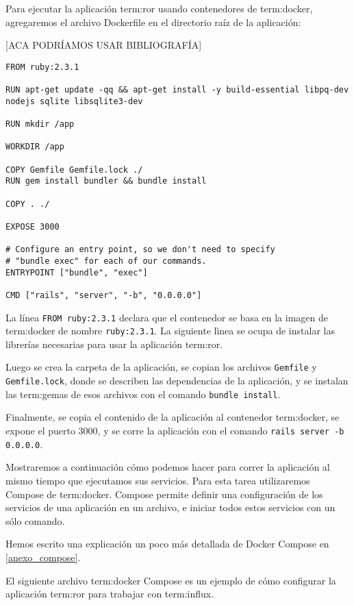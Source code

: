 Para ejecutar la aplicación \gls{term:ror} usando contenedores de
\gls{term:docker}, agregaremos el archivo Dockerfile en el directorio raíz de
la aplicación:

[ACA PODRÍAMOS USAR BIBLIOGRAFÍA]

\begin{lstlisting}
FROM ruby:2.3.1

RUN apt-get update -qq && apt-get install -y build-essential libpq-dev nodejs sqlite libsqlite3-dev

RUN mkdir /app

WORKDIR /app

COPY Gemfile Gemfile.lock ./
RUN gem install bundler && bundle install

COPY . ./

EXPOSE 3000

# Configure an entry point, so we don't need to specify 
# "bundle exec" for each of our commands.
ENTRYPOINT ["bundle", "exec"]

CMD ["rails", "server", "-b", "0.0.0.0"]
\end{lstlisting}

La línea \lstinline{FROM ruby:2.3.1} declara que el contenedor se basa en la
imagen de \gls{term:docker} de nombre \lstinline{ruby:2.3.1}. La siguiente
lìnea se ocupa de instalar las librerías necesarias para usar la aplicación
\gls{term:ror}.

Luego se crea la carpeta de la aplicación, se copian los archivos
\lstinline{Gemfile} y \lstinline{Gemfile.lock}, donde se describen las
dependencias de la aplicación, y se instalan las \glspl{term:gema} de esos
archivos con el comando \lstinline{bundle install}.

Finalmente, se copia el contenido de la aplicación al contenedor
\gls{term:docker}, se expone el puerto 3000, y se corre la aplicación con el
comando \lstinline{rails server -b 0.0.0.0}.

Mostraremos a continuación cómo podemos hacer para correr la aplicación al
mismo tiempo que ejecutamos sus servicios. Para esta tarea utilizaremos Compose
de \gls{term:docker}. Compose permite definir una configuración de los
servicios de una aplicación en un archivo, e iniciar todos estos servicios con
un sólo comando.

Hemos escrito una explicación un poco más detallada de Docker Compose en
\autoref{anexo_compose}.

El siguiente archivo \gls{term:docker} Compose es un ejemplo de cómo configurar
la aplicación \gls{term:ror} para trabajar con \gls{term:influx}.

